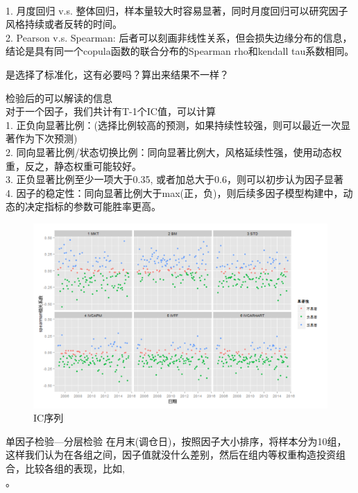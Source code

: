 \documentclass[12pt]{article}
\theoremstyle{definition}
\begin{document}
\begin{sremark}{}{} \\
1. 月度回归 v.s. 整体回归，样本量较大时容易显著，同时月度回归可以研究因子风格持续或者反转的时间。 \\
2. Pearson v.s. Spearman: 后者可以刻画非线性关系，但会损失边缘分布的信息，结论是具有同一个copula函数的联合分布的Spearman rho和kendall tau系数相同。
\end{sremark}
是选择了标准化，这有必要吗？算出来结果不一样？
\begin{sremark}{}{} 检验后的可以解读的信息 \\
对于一个因子，我们共计有T-1个IC值，可以计算 \\
1. 正负向显著比例：(选择比例较高的预测，如果持续性较强，则可以最近一次显著作为下次预测) \\
2. 同向显著比例/状态切换比例：同向显著比例大，风格延续性强，使用动态权重，反之，静态权重可能较好。\\
3. 正负显著比例至少一项大于0.35, 或者加总大于0.6，则可以初步认为因子显著 \\
4. 因子的稳定性：同向显著比例大于max(正，负)，则后续多因子模型构建中，动态的决定指标的参数可能胜率更高。
\end{sremark}
\begin{figure}[htb]
\centering
\includegraphics[scale=0.6]{figure/IC显著性.jpg}
\caption{IC序列}
\end{figure}

\begin{sdefinition}{单因子检验—分层检验}{}
在月末(调仓日)，按照因子大小排序，将样本分为10组，这样我们认为在各组之间，因子值就没什么差别，然后在组内等权重构造投资组合，比较各组的表现，比如, \\
。
\end{sdefinition}
\end{document}

